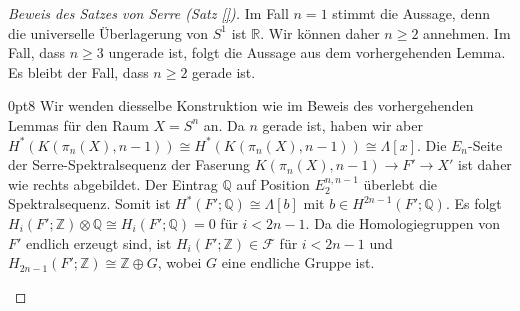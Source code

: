 \documentclass[11pt, a4paper, german]{article}
\theoremstyle{definition}
\theoremstyle{remark}
\newcommand{\R}{\mathbb{R}} %
\newcommand{\Z}{\mathbb{Z}} %
\newcommand{\Q}{\mathbb{Q}} %
\newcommand{\F}{\mathcal{F}} %
\newcommand{\zeroDot}[2]{\node[draw,circle,inner sep=0.4pt,fill] at (#1,#2) {};} %
\begin{document}
\begin{proof}[Beweis des Satzes von Serre (Satz \ref{})]
  Im Fall $n=1$ stimmt die Aussage, denn die universelle Überlagerung von $S^1$ ist $\R$.
  Wir können daher $n \geq 2$ annehmen.
  Im Fall, dass $n \geq 3$ ungerade ist, folgt die Aussage aus dem vorhergehenden Lemma.
  Es bleibt der Fall, dass $n \geq 2$ gerade ist.

  \vspace{2em}

  \renewcommand\windowpagestuff{
    \begin{center}\begin{tikzpicture}[x=16pt,y=16pt]\begin{scope}[shift={(0,0)}]
      \foreach \x in {1,2,3,5}{
        \foreach \y in {0,1,...,3}{
          \zeroDot{\x}{\y}
        }
      }
      \foreach \x in {0,...,5}{
        \zeroDot{\x}{4}
      }
      \node at (0,0) {$\Q$\small $1$};
      \zeroDot{0}{1}
      \zeroDot{0}{2}
      \node at (0,3) {$\Q$\small $a$};
      \node at (4,0) {$\Q$\small $x$};
      \zeroDot{4}{1}
      \zeroDot{4}{2}
      \node at (4,3) {$\Q$\small $ax$};
      \draw[->,gray] (0.6,2.6) -- (3.4,0.4);
      \draw[->] (-0.7,-0.6) -- (6,-0.6); %
      \draw[->] (-0.7,-0.6) -- (-0.7,4.5); %
      \node[left] at (-0.7,0) {$0$};
      \node[left] at (-0.9,1.7) {\vdots};
      \node[left] at (-0.7,3) {$n{-}1$};
      \node[below] at (0,-0.6) {$0$};
      \node[below] at (2,-0.7) {$\cdots$};
      \node[below] at (4,-0.7) {$n$};
    \end{scope}\end{tikzpicture}\end{center}
  }
  \opencutright
  \begin{cutout}{0}{\dimexpr\linewidth-5cm\relax}{0pt}{8}
    Wir wenden diesselbe Konstruktion wie im Beweis des vorhergehenden Lemmas für den Raum $X = S^n$ an.
    Da $n$ gerade ist, haben wir aber $H^*(K(\pi_n(X), n{-}1)) \cong H^*(K(\pi_n(X), n{-}1)) \cong \Lambda[x]$.
    Die $E_n$-Seite der Serre-Spektralsequenz der Faserung $K(\pi_n(X), n{-}1) \to F' \to X'$ ist daher wie rechts abgebildet.
    Der Eintrag $\Q$ auf Position $E_2^{n,n-1}$ überlebt die Spektralsequenz.
    Somit ist $H^*(F'; \Q) \cong \Lambda[b]$ mit $b \in H^{2n-1}(F'; \Q)$.
    Es folgt $H_i(F'; \Z) \otimes \Q \cong H_i(F'; \Q) = 0$ für $i < 2n-1$.
    Da die Homologiegruppen von $F'$ endlich erzeugt sind, ist $H_i(F'; \Z) \in \F$ für $i < 2n-1$ und $H_{2n-1}(F'; \Z) \cong \Z \oplus G$, wobei $G$ eine endliche Gruppe ist.

\end{cutout}
\end{proof}
\end{document}
